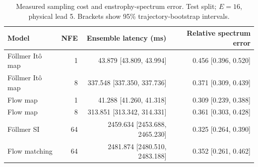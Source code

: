 \begin{table}[t]
\centering
\small
\setlength{\tabcolsep}{3pt}
\caption{Measured sampling cost and enstrophy-spectrum error. Test split; $E=16$, physical lead 5. Brackets show 95\% trajectory-bootstrap intervals.}
\label{tab:map-cost}
\begin{tabular}{lrrr}
\toprule
Model & NFE & Ensemble latency (ms) & Relative spectrum error \\
\midrule
Föllmer Itô map & 1 & 43.879 [43.809, 43.994] & 0.456 [0.396, 0.520] \\
Föllmer Itô map & 8 & 337.548 [337.350, 337.736] & 0.371 [0.309, 0.439] \\
\addlinespace
Flow map & 1 & 41.288 [41.260, 41.318] & 0.309 [0.239, 0.388] \\
Flow map & 8 & 313.851 [313.342, 314.331] & 0.361 [0.303, 0.428] \\
\addlinespace
Föllmer SI & 64 & 2459.634 [2453.688, 2465.230] & 0.325 [0.264, 0.390] \\
\addlinespace
Flow matching & 64 & 2481.874 [2480.510, 2483.188] & 0.352 [0.261, 0.462] \\
\bottomrule
\end{tabular}
\end{table}
